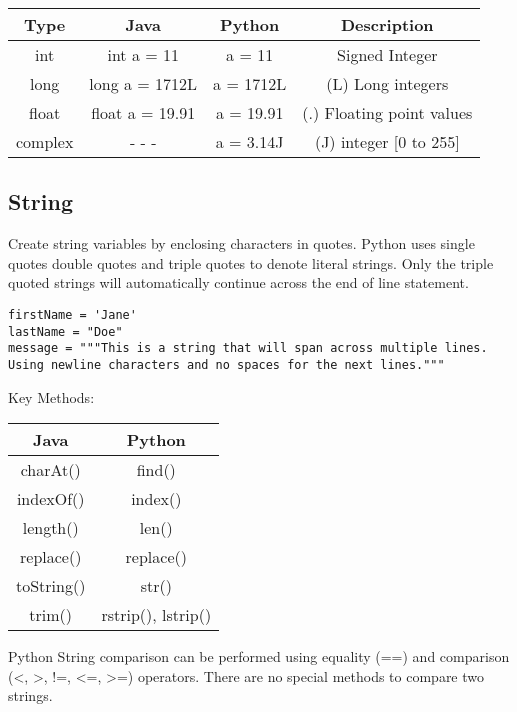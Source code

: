 \documentclass[a4paper,9pt]{extarticle}
\begin{document}
\begin{multicols*}{2}
\begin{center}
 \begin{tabular}{||c | c | c | c||}
 \hline
 Type & Java & Python & Description \\ [0.5ex]
 \hline\hline
 int & int a = 11 & a = 11 & Signed Integer\\
 \hline
 long & long a = 1712L & a = 1712L & (L) Long integers\\
 \hline
 float & float a = 19.91 & a = 19.91 &  (.) Floating point values\\
 \hline
 complex & - - - & a = 3.14J & (J) integer [0 to 255]\\
 \hline
\end{tabular}
\end{center}

\newpage
\subsection{String}
Create string variables by enclosing characters in quotes. Python uses single quotes  double quotes  and triple quotes  to denote literal strings. Only the triple quoted strings  will automatically continue across the end of line statement.

\begin{lstlisting}
firstName = 'Jane'
lastName = "Doe"
message = """This is a string that will span across multiple lines. Using newline characters and no spaces for the next lines."""
\end{lstlisting}

Key Methods:
\begin{center}
 \begin{tabular}{||c | c||}
 \hline
 Java & Python\\ [1ex]
 \hline\hline
 charAt() & find()\\
 \hline
 indexOf() & index()\\
 \hline
 length() & len()\\
 \hline
replace() & replace()\\
 \hline
 toString() & str()\\
 \hline
 trim() & rstrip(), lstrip()\\
 \hline
\end{tabular}
\end{center}

Python String comparison can be performed using equality (==) and comparison (<, >, !=, <=, >=) operators. There are no special methods to compare two strings.


\end{multicols*}
\end{document}
